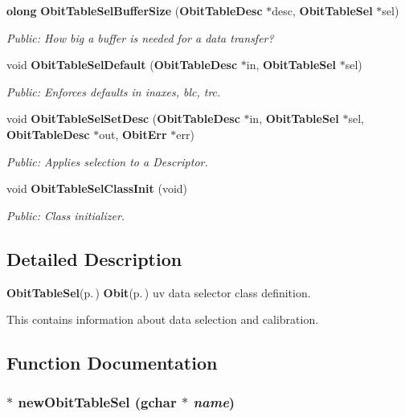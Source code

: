 \begin{CompactItemize}
{\bf olong} {\bf Obit\-Table\-Sel\-Buffer\-Size} ({\bf Obit\-Table\-Desc} $\ast$desc, {\bf Obit\-Table\-Sel} $\ast$sel)
\begin{CompactList}\small\item\em Public: How big a buffer is needed for a data transfer? \item\end{CompactList}\item 
void {\bf Obit\-Table\-Sel\-Default} ({\bf Obit\-Table\-Desc} $\ast$in, {\bf Obit\-Table\-Sel} $\ast$sel)
\begin{CompactList}\small\item\em Public: Enforces defaults in inaxes, blc, trc. \item\end{CompactList}\item 
void {\bf Obit\-Table\-Sel\-Set\-Desc} ({\bf Obit\-Table\-Desc} $\ast$in, {\bf Obit\-Table\-Sel} $\ast$sel, {\bf Obit\-Table\-Desc} $\ast$out, {\bf Obit\-Err} $\ast$err)
\begin{CompactList}\small\item\em Public: Applies selection to a Descriptor. \item\end{CompactList}\item 
void {\bf Obit\-Table\-Sel\-Class\-Init} (void)
\begin{CompactList}\small\item\em Public: Class initializer. \item\end{CompactList}\end{CompactItemize}


\subsection{Detailed Description}
{\bf Obit\-Table\-Sel}{\rm (p.\,\pageref{structObitTableSel})} {\bf Obit}{\rm (p.\,\pageref{structObit})} uv data selector class definition. 

This contains information about data selection and calibration.

\subsection{Function Documentation}
\subsubsection{$\ast$ new\-Obit\-Table\-Sel (gchar $\ast$ {\em name})}\label{ObitTableSel_8c_a6}


